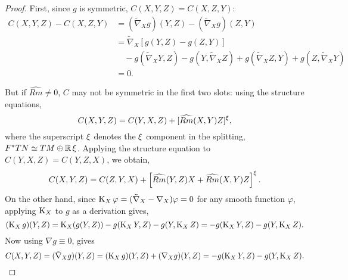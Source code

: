\documentclass{amsart}
\begin{document}
\begin{proof}
First, since $g$ is symmetric, $C(X, Y, Z) = C(X, Z, Y)$:
\[
\begin{split}
C(X, Y, Z) - C(X, Z, Y) &= (\tilde{\nabla}_X g) (Y, Z) - (\tilde{\nabla}_X g) (Z, Y) \\
&= \tilde{\nabla}_X \left[g(Y, Z) - g(Z, Y)\right] \\
&\quad - g(\tilde{\nabla}_X Y, Z) - g(Y, \tilde{\nabla}_X Z) + g(\tilde{\nabla}_X Z, Y) + g(Z, \tilde{\nabla}_X Y) \\
&= 0.
\end{split}
\]

But if $\widehat{Rm} \ne 0$, $C$ may not be symmetric in the first two slots: using the structure equations,
\begin{equation}
\label{eq:cubic_symmetry}
C(X, Y, Z) = C(Y, X, Z) + [\widehat{Rm}(X, Y)Z]^{\operatorname{\xi}},
\end{equation}
where the superscript $\operatorname{\xi}$ denotes the $\operatorname{\xi}$ component in the splitting, $F^{\ast} TN \simeq TM \oplus \mathbb{R} \operatorname{\xi}$. Applying the structure equation to $C(Y, X, Z) = C(Y, Z, X)$, we obtain,
\begin{equation}
\label{eq:cubic_permutation1}
C(X, Y, Z) = C(Z, Y, X) + \left[\widehat{Rm}(Y, Z) X + \widehat{Rm}(X, Y) Z\right]^{\operatorname{\xi}}.
\end{equation}
On the other hand, since $\operatorname{K}_X \varphi = (\tilde{\nabla}_X - \nabla_X) \varphi = 0$ for any smooth function $\varphi$, applying $\operatorname{K}_X$ to $g$ as a derivation gives,
\[
(\operatorname{K}_X g) (Y, Z) = \operatorname{K}_X (g(Y, Z)) - g(\operatorname{K}_X Y, Z) - g(Y, \operatorname{K}_X Z) = -g(\operatorname{K}_X Y, Z) - g(Y, \operatorname{K}_X Z).
\]
Now using $\nabla g \equiv 0$, gives
\begin{equation}
\label{eq:cubic_derivation_identity}
C(X, Y, Z) = (\tilde{\nabla}_X g) (Y, Z) = (\operatorname{K}_X g) (Y, Z) + (\nabla_X g) (Y, Z) = -g(\operatorname{K}_X Y, Z) - g(Y, \operatorname{K}_X Z).
\end{equation}


\end{proof}
\end{document}
